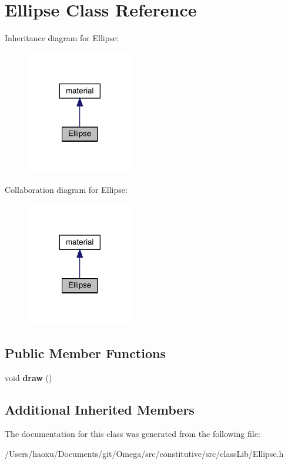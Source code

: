 \hypertarget{class_ellipse}{}\section{Ellipse Class Reference}
\label{class_ellipse}


Inheritance diagram for Ellipse\+:
\nopagebreak
\begin{figure}[H]
\begin{center}
\leavevmode
\includegraphics[width=132pt]{class_ellipse__inherit__graph}
\end{center}
\end{figure}


Collaboration diagram for Ellipse\+:
\nopagebreak
\begin{figure}[H]
\begin{center}
\leavevmode
\includegraphics[width=132pt]{class_ellipse__coll__graph}
\end{center}
\end{figure}
\subsection*{Public Member Functions}
\begin{DoxyCompactItemize}
\item 
\mbox{\label{class_ellipse_a312c0cf0e855dc79d37c07ec52bf202e}} 
void {\bfseries draw} ()
\end{DoxyCompactItemize}
\subsection*{Additional Inherited Members}


The documentation for this class was generated from the following file\+:\begin{DoxyCompactItemize}
\item 
/\+Users/haoxu/\+Documents/git/\+Omega/src/constitutive/src/class\+Lib/Ellipse.\+h\end{DoxyCompactItemize}
